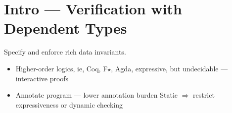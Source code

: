 \section{Intro --- Verification with Dependent Types}

Specify and enforce rich data invariants.
\begin{itemize}
\item Higher-order logics, ie, Coq, F$\star$, Agda, 
expressive, but undecidable --- interactive proofs
\item Annotate program --- lower annotation burden \cite{OuTMW04} 
Static $\Rightarrow $ restrict expressiveness or dynamic checking
\end{itemize}
